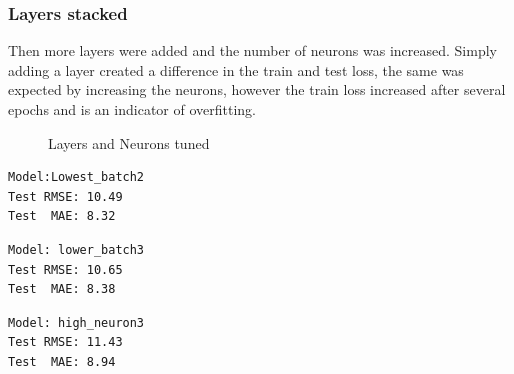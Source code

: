 \documentclass[10pt,11pt,12pt,oneside]{book}
\begin{document}
\subsubsection{Layers stacked}
Then more layers were added and the number of neurons was increased. Simply adding a layer created a difference in the train and test loss, the same was expected by increasing the neurons, however the train loss increased after several epochs and is an indicator of overfitting.\\
\begin{figure}[H]
    \centering
    \qquad
    \caption{Layers and Neurons tuned}%
    \label{fig:layers}%
\end{figure}
\begin{multicols}{3}
\centering
\begin{verbatim}
Model:Lowest_batch2
Test RMSE: 10.49
Test  MAE: 8.32
\end{verbatim}
\begin{verbatim}
Model: lower_batch3
Test RMSE: 10.65
Test  MAE: 8.38
\end{verbatim}
\begin{verbatim}
Model: high_neuron3
Test RMSE: 11.43
Test  MAE: 8.94
\end{verbatim}
\end{multicols}
\end{document}
